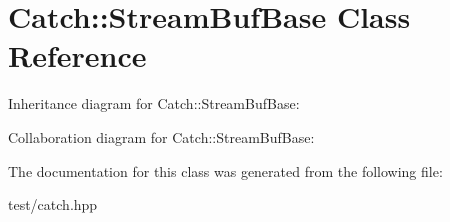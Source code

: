 \hypertarget{classCatch_1_1StreamBufBase}{}\section{Catch\+:\+:Stream\+Buf\+Base Class Reference}
\label{classCatch_1_1StreamBufBase}


Inheritance diagram for Catch\+:\+:Stream\+Buf\+Base\+:


Collaboration diagram for Catch\+:\+:Stream\+Buf\+Base\+:


The documentation for this class was generated from the following file\+:\begin{DoxyCompactItemize}
\item 
test/catch.\+hpp\end{DoxyCompactItemize}

